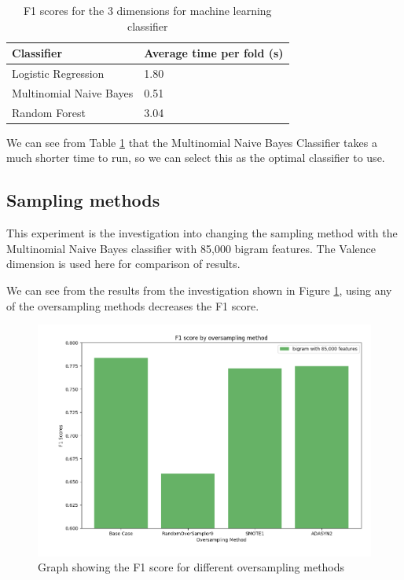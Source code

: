 \begin{table}
\centering
\caption{F1 scores for the 3 dimensions for machine learning classifier}
\begin{tabular}{ |p{3cm}|p{3cm}|}
 \hline
  Classifier & Average time per fold (s)\\
 \hline
  Logistic Regression & 1.80\\
  Multinomial Naive Bayes & 0.51 \\
  Random Forest & 3.04\\
 \hline
\end{tabular}
\label{model:times}
\end{table}

We can see from Table \ref{model:times} that the Multinomial Naive Bayes Classifier takes a much shorter time to run, so we can select this as the optimal classifier to use.

\subsection{Sampling methods}

This experiment is the investigation into changing the sampling method with the Multinomial Naive Bayes classifier with 85,000 bigram features. The Valence dimension is used here for comparison of results.

We can see from the results from the investigation shown in  Figure \ref{oversamplegraph}, using any of the oversampling methods decreases the F1 score. 

\begin{figure}[h]
\centering
\includegraphics[scale=0.5]{graphs/OversampleNB.png}
\caption{Graph showing the F1 score for different oversampling methods}
\label{oversamplegraph}
\end{figure}

